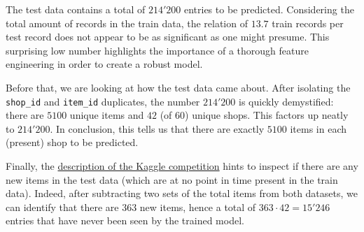 The test data contains a total of $214'200$ entries to be predicted. Considering the total amount of records in the train data, the relation of $13.7$ train records per test record does not appear to be as significant as one might presume.
This surprising low number highlights the importance of a thorough feature engineering in order to create a robust model.

Before that, we are looking at how the test data came about. After isolating the \texttt{shop\_id} and \texttt{item\_id} duplicates, the number $214'200$ is quickly demystified: there are $5100$ unique items and $42$ (of $60$) unique shops. 
This factors up neatly to $214'200$.
In conclusion, this tells us that there are exactly $5100$ items in each (present) shop to be predicted.

Finally, the \href{https://www.kaggle.com/c/competitive-data-science-predict-future-sales/data}{description of the Kaggle competition} hints to inspect if there are any new items in the test data (which are at no point in time present in the train data). 
Indeed, after subtracting two sets of the total items from both datasets, we can identify that there are $363$ new items, hence a total of $363 \cdot 42=15'246$ entries that have never been seen by the trained model.
